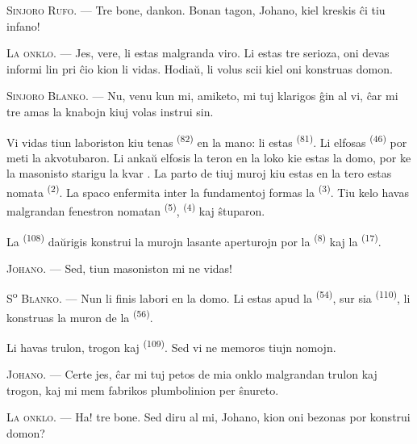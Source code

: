 \textsc{Sinjoro Rufo}. --- Tre bone, dankon. Bonan tagon, Johano, kiel kreskis
ĉi tiu infano!

\textsc{La onklo}. --- Jes, vere, li estas malgranda viro. Li estas tre
serioza, oni devas informi lin pri ĉio kion li vidas. Hodiaŭ, li volus scii
kiel oni konstruas domon.

\VUsaut{3.0mm}

\textsc{Sinjoro Blanko}. --- Nu, venu kun mi, amiketo, mi tuj klarigos ĝin al
vi, ĉar mi tre amas la knabojn kiuj volas instrui sin.

Vi vidas tiun laboriston kiu tenas  \textsuperscript{(82)} en
la mano: li estas  \textsuperscript{(81)}. Li elfosas
 \textsuperscript{(46)} por meti la akvotubaron. Li ankaŭ
elfosis la teron en la loko kie estas la domo, por ke la masonisto starigu la
kvar . La parto de tiuj muroj kiu estas en la tero estas
nomata  \textsuperscript{(2)}. La spaco enfermita inter la
fundamentoj formas la  \textsuperscript{(3)}. Tiu kelo havas
malgrandan fenestron nomatan  \textsuperscript{(5)},
 \textsuperscript{(4)} kaj ŝtuparon.

La  \textsuperscript{(108)} daŭrigis konstrui la murojn
lasante aperturojn por la  \textsuperscript{(8)} kaj la
 \textsuperscript{(17)}.

\textsc{Johano}. --- Sed, tiun masoniston mi ne vidas!

S\textsuperscript{o} \textsc{Blanko}. --- Nun li finis labori en la domo. Li
estas apud la  \textsuperscript{(54)}, sur sia
 \textsuperscript{(110)}, li konstruas la muron de la
 \textsuperscript{(56)}.

Li havas trulon, trogon kaj  \textsuperscript{(109)}. Sed
vi ne memoros tiujn nomojn.

\textsc{Johano}. --- Certe jes, ĉar mi tuj petos de mia onklo malgrandan
trulon kaj trogon, kaj mi mem fabrikos plumbolinion per ŝnureto.

\VUsaut{3.0mm}
\VUsaut{3.0mm}

\textsc{La onklo}. --- Ha! tre bone. Sed diru al mi, Johano, kion oni bezonas
por konstrui domon?

